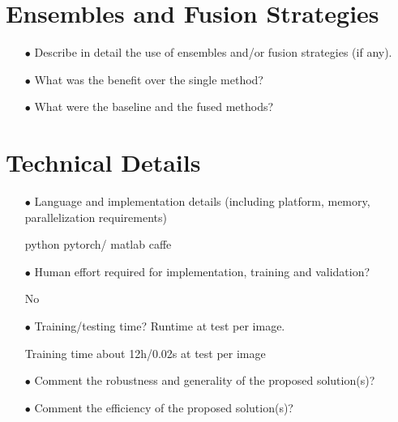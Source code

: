 \documentclass[runningheads]{llncs}
\begin{document}
\section{Ensembles and Fusion Strategies}
\begin{spacing}{1.5}
\begin{itemize}

\item[$\bullet$] Describe in detail the use of ensembles and/or fusion strategies (if any). 

\item[$\bullet$] What was the benefit over the single method?

\item[$\bullet$] What were the baseline and the fused methods?

\end{itemize}
\end{spacing}

\section{Technical Details}
\begin{spacing}{1.5}
\begin{itemize}
\item[$\bullet$] Language and implementation details (including platform, memory, parallelization requirements)

python pytorch/ matlab caffe

\item[$\bullet$] Human effort required for implementation, training and validation?
 
No

\item[$\bullet$] Training/testing time? Runtime at test per image. 

Training time about 12h/0.02s at test per image

\item[$\bullet$] Comment the robustness and generality of the proposed solution(s)? 

\item[$\bullet$] Comment the efficiency of the proposed solution(s)?

\end{itemize}
\end{spacing}
\end{document}
